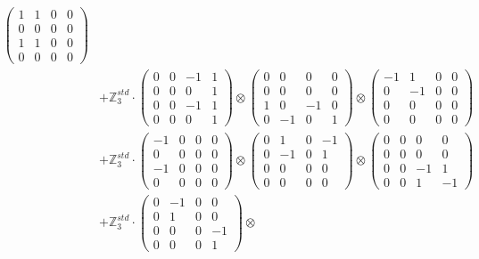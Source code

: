 \documentclass{article}
\begin{document}
{\begin{align}
            \begin{pmatrix} 1 & 1 & 0 & 0 \\ 0 & 0 & 0 & 0 \\ 1 & 1 & 0 & 0 \\ 0 & 0 & 0 & 0 \end{pmatrix} \\ 
        &+ \label{Rs1-Rc16-Solution-5-c7} \mathbb{Z}_3^{std} \cdot 
            \begin{pmatrix} 0 & 0 & -1 & 1 \\ 0 & 0 & 0 & 1 \\ 0 & 0 & -1 & 1 \\ 0 & 0 & 0 & 1 \end{pmatrix} \otimes 
            \begin{pmatrix} 0 & 0 & 0 & 0 \\ 0 & 0 & 0 & 0 \\ 1 & 0 & -1 & 0 \\ 0 & -1 & 0 & 1 \end{pmatrix} \otimes 
            \begin{pmatrix} -1 & 1 & 0 & 0 \\ 0 & -1 & 0 & 0 \\ 0 & 0 & 0 & 0 \\ 0 & 0 & 0 & 0 \end{pmatrix} \\ 
        &+ \label{Rs1-Rc16-Solution-5-c8} \mathbb{Z}_3^{std} \cdot 
            \begin{pmatrix} -1 & 0 & 0 & 0 \\ 0 & 0 & 0 & 0 \\ -1 & 0 & 0 & 0 \\ 0 & 0 & 0 & 0 \end{pmatrix} \otimes 
            \begin{pmatrix} 0 & 1 & 0 & -1 \\ 0 & -1 & 0 & 1 \\ 0 & 0 & 0 & 0 \\ 0 & 0 & 0 & 0 \end{pmatrix} \otimes 
            \begin{pmatrix} 0 & 0 & 0 & 0 \\ 0 & 0 & 0 & 0 \\ 0 & 0 & -1 & 1 \\ 0 & 0 & 1 & -1 \end{pmatrix} \\ 
        &+ \label{Rs1-Rc16-Solution-5-c9} \mathbb{Z}_3^{std} \cdot 
            \begin{pmatrix} 0 & -1 & 0 & 0 \\ 0 & 1 & 0 & 0 \\ 0 & 0 & 0 & -1 \\ 0 & 0 & 0 & 1 \end{pmatrix} \otimes 

\end{align}}
\end{document}
